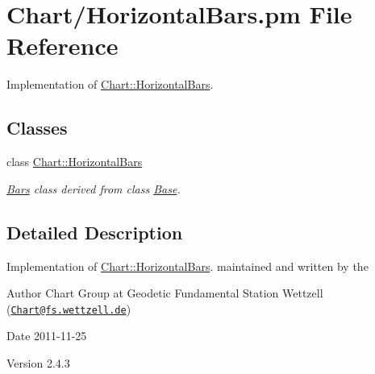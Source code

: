 \hypertarget{HorizontalBars_8pm}{
\section{Chart/HorizontalBars.pm File Reference}
\label{HorizontalBars_8pm}
}


Implementation of \hyperlink{classChart_1_1HorizontalBars}{Chart::HorizontalBars}.  


\subsection*{Classes}
\begin{DoxyCompactItemize}
\item 
class \hyperlink{classChart_1_1HorizontalBars}{Chart::HorizontalBars}
\begin{DoxyCompactList}\small\item\em \hyperlink{classChart_1_1Bars}{Bars} class derived from class \hyperlink{classChart_1_1Base}{Base}. \item\end{DoxyCompactList}\end{DoxyCompactItemize}


\subsection{Detailed Description}
Implementation of \hyperlink{classChart_1_1HorizontalBars}{Chart::HorizontalBars}. maintained and written by the \begin{DoxyAuthor}{Author}
Chart Group at Geodetic Fundamental Station Wettzell (\href{mailto:Chart@fs.wettzell.de}{\tt Chart@fs.wettzell.de}) 
\end{DoxyAuthor}
\begin{DoxyDate}{Date}
2011-\/11-\/25 
\end{DoxyDate}
\begin{DoxyVersion}{Version}
2.4.3 
\end{DoxyVersion}
